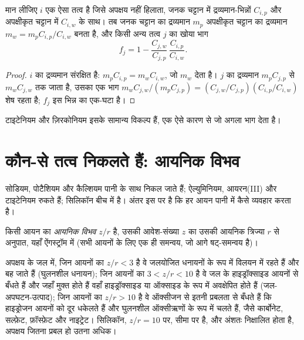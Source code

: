 \begin{proposition}[एक अचल तत्व के साथ द्रव्यमान-संतुलन]\label{prop:b1:weathering-clays:immobile}
मान लीजिए $i$ एक ऐसा तत्व है जिसे अपक्षय नहीं हिलाता, जनक चट्टान में द्रव्यमान-भिन्नों $C_{i,p}$ और अपक्षीकृत चट्टान में $C_{i,w}$ के साथ। तब जनक चट्टान का द्रव्यमान $m_p$ अपक्षीकृत चट्टान का द्रव्यमान $m_w = m_p C_{i,p}/C_{i,w}$ बनता है, और किसी अन्य तत्व $j$ का खोया भाग
\[
  f_j = 1 - \frac{C_{j,w}}{C_{j,p}}\,\frac{C_{i,p}}{C_{i,w}} .
\]
\end{proposition}

\begin{proof}
$i$ का द्रव्यमान संरक्षित है: $m_p C_{i,p} = m_w C_{i,w}$, जो $m_w$ देता है। $j$ का द्रव्यमान $m_p C_{j,p}$ से $m_w C_{j,w}$ तक जाता है, उसका एक भाग
$m_w C_{j,w}/(m_p C_{j,p}) = (C_{j,w}/C_{j,p})(C_{i,p}/C_{i,w})$ शेष रहता है; $f_j$ इस भिन्न का एक-घटा है।
\end{proof}

टाइटेनियम और ज़िरकोनियम इसके सामान्य विकल्प हैं, एक ऐसे कारण से जो अगला भाग देता है।

\section{कौन-से तत्व निकलते हैं: आयनिक विभव}\label{sec:b1:weathering-clays:ionic}

सोडियम, पोटैशियम और कैल्शियम पानी के साथ निकल जाते हैं; ऐल्युमिनियम, आयरन(III) और टाइटेनियम रुकते हैं; सिलिकॉन बीच में है। अंतर इस पर है कि हर आयन पानी में कैसे व्यवहार करता है।

\begin{definition}[आयनिक विभव]\label{def:b1:weathering-clays:ionic-potential}
किसी आयन का \emph{आयनिक विभव} $z/r$ है, उसकी आवेश-संख्या $z$ का उसकी आयनिक त्रिज्या $r$ से अनुपात, यहाँ ऐंगस्ट्रॉम में (सभी आयनों के लिए एक ही समन्वय, जो आगे षट्-समन्वय है)।
\end{definition}

\begin{proposition}[आयनिक विभव के तीन क्षेत्र]\label{prop:b1:weathering-clays:fields}
अपक्षय के जल में, जिन आयनों का $z/r < 3$ है वे जलयोजित धनायनों के रूप में विलयन में रहते हैं और बह जाते हैं (घुलनशील धनायन); जिन आयनों का $3 < z/r < 10$ है वे जल के हाइड्रॉक्साइड आयनों से बँधते हैं और जहाँ मुक्त होते हैं वहाँ हाइड्रॉक्साइड या ऑक्साइड के रूप में अवक्षेपित होते हैं (जल-अपघटन-उत्पाद); जिन आयनों का $z/r > 10$ है वे ऑक्सीजन से इतनी प्रबलता से बँधते हैं कि हाइड्रोजन आयनों को दूर धकेलते हैं और घुलनशील ऑक्सीऋणों के रूप में चलते हैं, जैसे कार्बोनेट, सल्फ़ेट, फ़ॉस्फ़ेट और नाइट्रेट। सिलिकॉन, $z/r = 10$ पर, सीमा पर है, और अंशतः निक्षालित होता है, अपक्षय जितना प्रबल हो उतना अधिक।
\end{proposition}
\admitted

